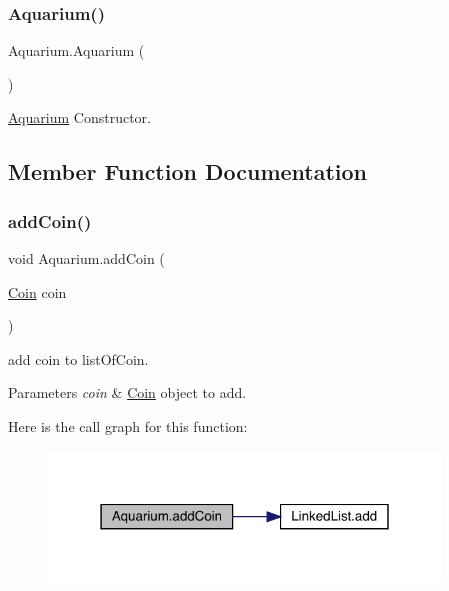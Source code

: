 \subsubsection{\texorpdfstring{Aquarium()}{Aquarium()}}
{\footnotesize\ttfamily Aquarium.\+Aquarium (\begin{DoxyParamCaption}{ }\end{DoxyParamCaption})\hspace{0.3cm}{\ttfamily [inline]}}

\mbox{\hyperlink{class_aquarium}{Aquarium}} Constructor. 

\subsection{Member Function Documentation}
\mbox{\label{class_aquarium_a8b33e39d738b36ef732fefbcfdbd9ab1}} 
\subsubsection{\texorpdfstring{add\+Coin()}{addCoin()}}
{\footnotesize\ttfamily void Aquarium.\+add\+Coin (\begin{DoxyParamCaption}\item[{\mbox{\hyperlink{class_coin}{Coin}}}]{coin }\end{DoxyParamCaption})\hspace{0.3cm}{\ttfamily [inline]}}

add coin to list\+Of\+Coin. 
\begin{DoxyParams}{Parameters}
{\em coin} & \mbox{\hyperlink{class_coin}{Coin}} object to add. \\
\hline
\end{DoxyParams}
Here is the call graph for this function\+:
\nopagebreak
\begin{figure}[H]
\begin{center}
\leavevmode
\includegraphics[width=295pt]{class_aquarium_a8b33e39d738b36ef732fefbcfdbd9ab1_cgraph}
\end{center}
\end{figure}
\mbox{\label{class_aquarium_a36020897197a43587bcedc6aaf617a0f}} 
